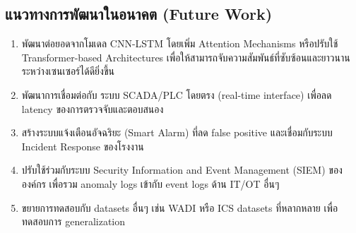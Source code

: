 \subsection{แนวทางการพัฒนาในอนาคต (Future Work)}
\begin{enumerate}
  \item พัฒนาต่อยอดจากโมเดล CNN-LSTM โดยเพิ่ม Attention Mechanisms หรือปรับใช้ \\ Transformer-based Architectures เพื่อให้สามารถจับความสัมพันธ์ที่ซับซ้อนและยาวนานระหว่างเซนเซอร์ได้ดียิ่งขึ้น
  \item พัฒนาการเชื่อมต่อกับ ระบบ SCADA/PLC โดยตรง (real-time interface) เพื่อลด latency ของการตรวจจับและตอบสนอง
  \item สร้างระบบแจ้งเตือนอัจฉริยะ (Smart Alarm) ที่ลด false positive และเชื่อมกับระบบ Incident Response ของโรงงาน
  \item ปรับใช้ร่วมกับระบบ Security Information and Event Management (SIEM) ขององค์กร เพื่อรวม anomaly logs เข้ากับ event logs ด้าน IT/OT อื่นๆ
  \item ขยายการทดสอบกับ datasets อื่นๆ เช่น WADI หรือ ICS datasets ที่หลากหลาย เพื่อทดสอบการ generalization
\end{enumerate}


